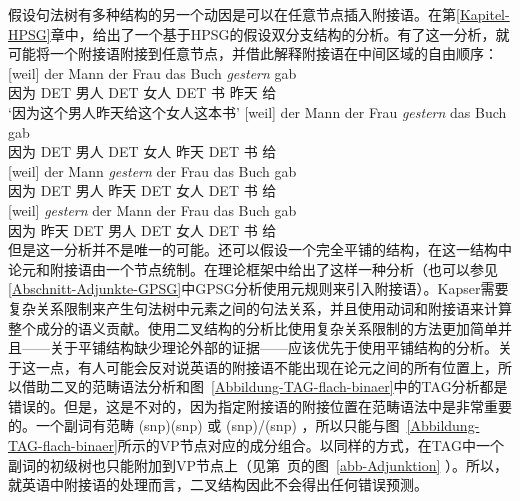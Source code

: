 假设句法树有多种结构的另一个动因是可以在任意节点插入附接语。在第\ref{Kapitel-HPSG}章中，给出了一个基于HPSG的假设双分支结构的分析。有了这一分析，就可能将一个附接语附接到任意节点，并借此解释附接语在中间区域的自由顺序：
\eal
\ex 
\gll {}[weil] der Mann der Frau das Buch \emph{gestern} gab\\
	 {}\spacebr{}因为 DET 男人 DET 女人 DET 书 昨天 给\\
\glt `因为这个男人昨天给这个女人这本书'	 
\ex 
\gll {}[weil] der Mann der Frau \emph{gestern} das Buch gab\\
	 {}\spacebr{}因为 DET 男人 DET 女人 昨天 DET 书 给\\
\ex 
\gll {}[weil] der Mann \emph{gestern} der Frau das Buch gab\\
	 {}\spacebr{}因为 DET 男人 昨天 DET 女人 DET 书 给\\
\ex 
\gll {}[weil] \emph{gestern} der Mann der Frau das Buch gab\\
	 {}\spacebr{}因为 昨天 DET 男人 DET 女人 DET 书 给\\
\zl
但是这一分析并不是唯一的可能。还可以假设一个完全平铺的结构，在这一结构中论元和附接语由一个节点统制。\citet{Kasper94a}在\hpsgc 理论框架中给出了这样一种分析（也可以参见\ref{Abschnitt-Adjunkte-GPSG}中GPSG分析使用元规则来引入附接语）。Kapser需要复杂关系限制来产生句法树中元素之间的句法关系，并且使用动词和附接语来计算整个成分的语义贡献。使用二叉结构的分析比使用复杂关系限制的方法更加简单并且——关于平铺结构缺少理论外部的证据——应该优先于使用平铺结构的分析。关于这一点，有人可能会反对说英语的附接语不能出现在论元之间的所有位置上，所以借助二叉的范畴语法分析和图~\ref{Abbildung-TAG-flach-binaer}中的TAG分析都是错误的。但是，这是不对的，因为指定附接语的附接位置在范畴语法中是非常重要的。一个副词有范畴 (s\bs np)\bs (s\bs np) 或 (s\bs np)/(s\bs np) ，所以只能与图~\ref{Abbildung-TAG-flach-binaer}所示的VP节点对应的成分组合。以同样的方式，在TAG中一个副词的初级树也只能附加到VP节点上（见第~\pageref{abb-Adjunktion}页的图~\ref{abb-Adjunktion} ）。所以，就英语中附接语的处理而言，二叉结构因此不会得出任何错误预测。
